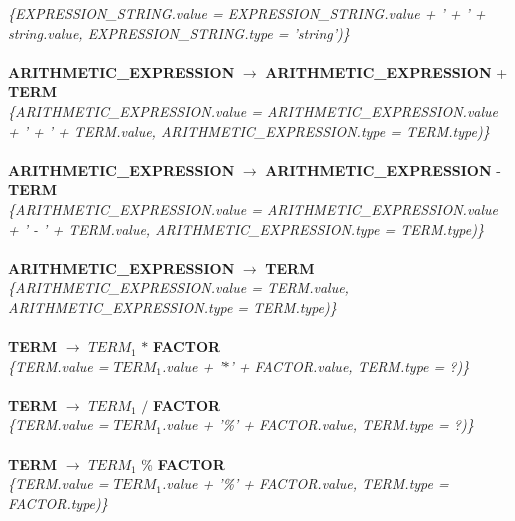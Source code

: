 \documentclass[10pt,a4paper]{article}
\begin{document}
\textit{\{EXPRESSION\_STRING.value =  EXPRESSION\_STRING.value + ' + ' + string.value, EXPRESSION\_STRING.type = 'string')\}}  \\ \\


\textbf{ARITHMETIC\_EXPRESSION} $\rightarrow$ \textbf{ARITHMETIC\_EXPRESSION} + \textbf{TERM} \\

\textit{\{ARITHMETIC\_EXPRESSION.value =  ARITHMETIC\_EXPRESSION.value + ' + ' + TERM.value, ARITHMETIC\_EXPRESSION.type = TERM.type)\}}  \\ \\


\textbf{ARITHMETIC\_EXPRESSION} $\rightarrow$ \textbf{ARITHMETIC\_EXPRESSION} - \textbf{TERM}  \\

\textit{\{ARITHMETIC\_EXPRESSION.value =  ARITHMETIC\_EXPRESSION.value + ' - ' + TERM.value, ARITHMETIC\_EXPRESSION.type = TERM.type)\}}  \\ \\


\textbf{ARITHMETIC\_EXPRESSION} $\rightarrow$ \textbf{TERM} \\

\textit{\{ARITHMETIC\_EXPRESSION.value = TERM.value, ARITHMETIC\_EXPRESSION.type = TERM.type)\}}  \\ \\


\textbf{TERM} $\rightarrow$ \textbf{$TERM_{1}$} $*$ \textbf{FACTOR}   \\

\textit{\{TERM.value = $TERM_{1}$.value + '$*$' + FACTOR.value, TERM.type = ?)\}}  \\ \\


\textbf{TERM} $\rightarrow$ \textbf{$TERM_{1}$} $/$ \textbf{FACTOR}   \\

\textit{\{TERM.value = $TERM_{1}$.value + '\%' + FACTOR.value, TERM.type = ?)\}}  \\ \\


\textbf{TERM} $\rightarrow$ \textbf{$TERM_{1}$} \% \textbf{FACTOR}  \\

\textit{\{TERM.value = $TERM_{1}$.value + '\%' + FACTOR.value, TERM.type = FACTOR.type)\}}  \\ \\
\end{document}
